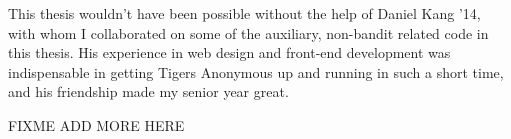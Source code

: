 This thesis wouldn't have been possible without the help of Daniel Kang '14, with whom I collaborated on some of the auxiliary, non-bandit related code in this thesis. His experience in web design and front-end development was indispensable in getting Tigers Anonymous up and running in such a short time, and his friendship made my senior year great. 

FIXME ADD MORE HERE
